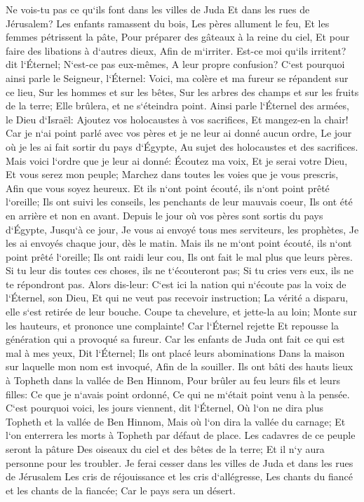 \verse Ne vois-tu pas ce qu`ils font dans les villes de Juda Et dans les rues de Jérusalem? 
\verse Les enfants ramassent du bois, Les pères allument le feu, Et les femmes pétrissent la pâte, Pour préparer des gâteaux à la reine du ciel, Et pour faire des libations à d`autres dieux, Afin de m`irriter. 
\verse Est-ce moi qu`ils irritent? dit l`Éternel; N`est-ce pas eux-mêmes, A leur propre confusion? 
\verse C`est pourquoi ainsi parle le Seigneur, l`Éternel: Voici, ma colère et ma fureur se répandent sur ce lieu, Sur les hommes et sur les bêtes, Sur les arbres des champs et sur les fruits de la terre; Elle brûlera, et ne s`éteindra point. 
\verse Ainsi parle l`Éternel des armées, le Dieu d`Israël: Ajoutez vos holocaustes à vos sacrifices, Et mangez-en la chair! 
\verse Car je n`ai point parlé avec vos pères et je ne leur ai donné aucun ordre, Le jour où je les ai fait sortir du pays d`Égypte, Au sujet des holocaustes et des sacrifices. 
\verse Mais voici l`ordre que je leur ai donné: Écoutez ma voix, Et je serai votre Dieu, Et vous serez mon peuple; Marchez dans toutes les voies que je vous prescris, Afin que vous soyez heureux. 
\verse Et ils n`ont point écouté, ils n`ont point prêté l`oreille; Ils ont suivi les conseils, les penchants de leur mauvais coeur, Ils ont été en arrière et non en avant. 
\verse Depuis le jour où vos pères sont sortis du pays d`Égypte, Jusqu`à ce jour, Je vous ai envoyé tous mes serviteurs, les prophètes, Je les ai envoyés chaque jour, dès le matin. 
\verse Mais ils ne m`ont point écouté, ils n`ont point prêté l`oreille; Ils ont raidi leur cou, Ils ont fait le mal plus que leurs pères. 
\verse Si tu leur dis toutes ces choses, ils ne t`écouteront pas; Si tu cries vers eux, ils ne te répondront pas. 
\verse Alors dis-leur: C`est ici la nation qui n`écoute pas la voix de l`Éternel, son Dieu, Et qui ne veut pas recevoir instruction; La vérité a disparu, elle s`est retirée de leur bouche. 
\verse Coupe ta chevelure, et jette-la au loin; Monte sur les hauteurs, et prononce une complainte! Car l`Éternel rejette Et repousse la génération qui a provoqué sa fureur. 
\verse Car les enfants de Juda ont fait ce qui est mal à mes yeux, Dit l`Éternel; Ils ont placé leurs abominations Dans la maison sur laquelle mon nom est invoqué, Afin de la souiller. 
\verse Ils ont bâti des hauts lieux à Topheth dans la vallée de Ben Hinnom, Pour brûler au feu leurs fils et leurs filles: Ce que je n`avais point ordonné, Ce qui ne m`était point venu à la pensée. 
\verse C`est pourquoi voici, les jours viennent, dit l`Éternel, Où l`on ne dira plus Topheth et la vallée de Ben Hinnom, Mais où l`on dira la vallée du carnage; Et l`on enterrera les morts à Topheth par défaut de place. 
\verse Les cadavres de ce peuple seront la pâture Des oiseaux du ciel et des bêtes de la terre; Et il n`y aura personne pour les troubler. 
\verse Je ferai cesser dans les villes de Juda et dans les rues de Jérusalem Les cris de réjouissance et les cris d`allégresse, Les chants du fiancé et les chants de la fiancée; Car le pays sera un désert. 

